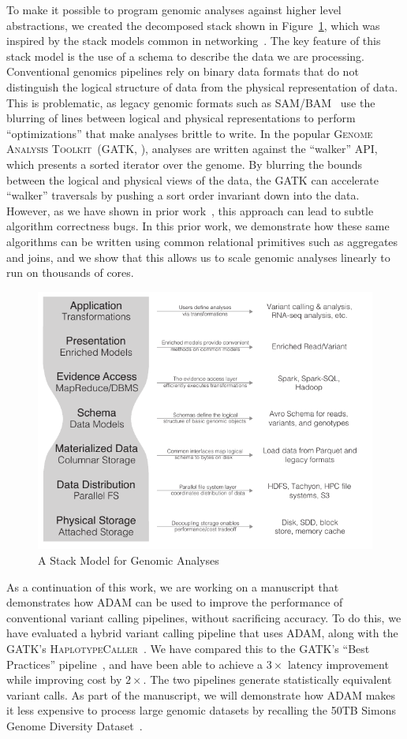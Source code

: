 \documentclass[11pt]{article} %
\begin{document}
To make it possible to program genomic analyses against higher level abstractions, we created the
decomposed stack shown in Figure~\ref{fig:stack-model}, which was inspired by the stack models
common in networking~\cite{zimmermann80}. The key feature of this stack model is the use of a
schema to describe the data we are processing. Conventional genomics pipelines rely on binary
data formats that do not distinguish the logical structure of data from the physical representation
of data. This is problematic, as legacy genomic formats such as SAM/BAM~\cite{li09} use the
blurring of lines between logical and physical representations to perform ``optimizations''
that make analyses brittle to write. In the popular \textsc{Genome Analysis Toolkit}~(GATK,
\cite{mckenna10}), analyses are written against the ``walker'' API, which presents a sorted
iterator over the genome. By blurring the bounds between the logical and physical views of the
data, the \textsc{GATK} can accelerate ``walker'' traversals by pushing a sort order invariant
down into the data. However, as we have shown in prior work~\cite{nothaft15}, this approach
can lead to subtle algorithm correctness bugs. In this prior work, we demonstrate how these
same algorithms can be written using common relational primitives such as aggregates and joins,
and we show that this allows us to scale genomic analyses linearly to run on thousands of cores.

\begin{figure}[h]
\begin{center}
\includegraphics[width=0.6\linewidth]{../ms-thesis/expanded-stack-2.pdf}
\caption{A Stack Model for Genomic Analyses}
\label{fig:stack-model}
\end{center}
\end{figure}

As a continuation of this work, we are working on a manuscript that demonstrates how \textsc{ADAM}
can be used to improve the performance of conventional variant calling pipelines, without
sacrificing accuracy. To do this, we have evaluated a hybrid variant calling pipeline that uses
\textsc{ADAM}, along with the \textsc{GATK}'s \textsc{HaplotypeCaller}~\cite{depristo11}. We
have compared this to the \textsc{GATK}'s ``Best Practices'' pipeline~\cite{auwera13}, and have
been able to achieve a $3\times$ latency improvement while improving cost by $2\times$. The
two pipelines generate statistically equivalent variant calls. As part of the manuscript, we
will demonstrate how \textsc{ADAM} makes it less expensive to process large genomic datasets
by recalling the 50TB Simons Genome Diversity Dataset~\cite{simons}.
\end{document}
